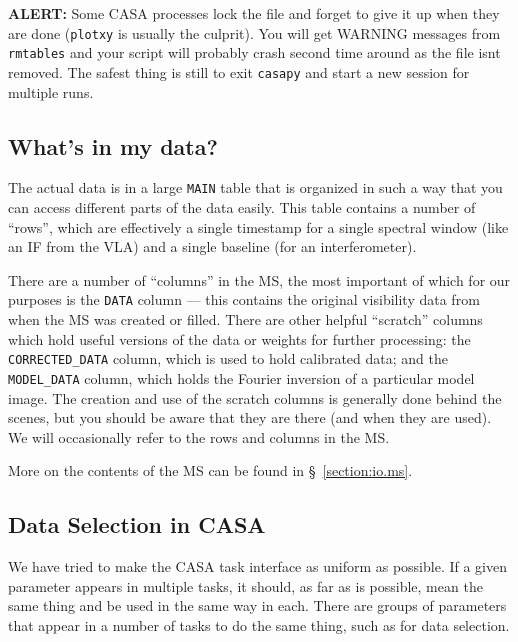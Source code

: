 {\bf ALERT:} Some CASA processes lock the file and forget to
give it up when they are done ({\tt plotxy} is usually the culprit).
You will get WARNING messages from {\tt rmtables} and your script
will probably crash second time around as the file isnt removed.
The safest thing is still to exit {\tt casapy} and start a new 
session for multiple runs.

\subsection{What's in my data?}
\label{section:intro.common.ms}

The actual data is in a large {\tt MAIN} table that is organized in
such a way that you can access different parts of the data easily.
This table contains a number of ``rows'', which are effectively a
single timestamp for a single spectral window (like an IF from the
VLA) and a single baseline (for an interferometer).  

There are a number of ``columns'' in the MS, the most important of
which for our purposes is the {\tt DATA} column --- this contains the
original visibility data from when the MS was created or filled.
There are other helpful ``scratch'' columns which hold useful versions
of the data or weights for further processing: the {\tt
  CORRECTED\_DATA} column, which is used to hold calibrated data; and
the {\tt MODEL\_DATA} column, which holds the Fourier inversion of a
particular model image.  The creation and use of the scratch columns
is generally done behind the scenes, but you should be aware that they
are there (and when they are used).  We will occasionally refer to the
rows and columns in the MS.

More on the contents of the MS can be found in \S~\ref{section:io.ms}.

\subsection{Data Selection in CASA}
\label{section:intro.common.selection}

We have tried to make the CASA task interface as uniform as possible.
If a given parameter appears in multiple tasks, it should, as far as
is possible, mean the same thing and be used in the same way in each.
There are groups of parameters that appear in a number of tasks to
do the same thing, such as for data selection.

